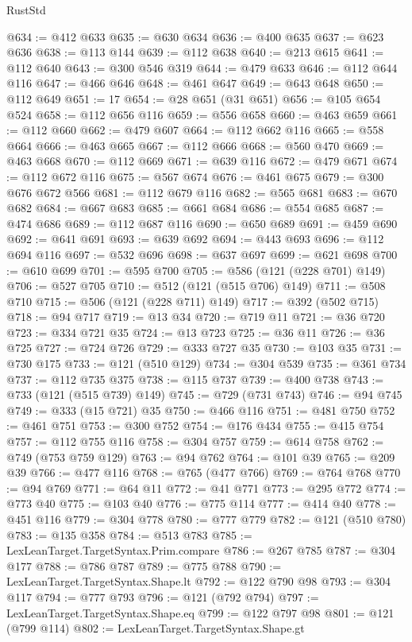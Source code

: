 \begin{lexlean}{RustStd}
\begin{coremodule}
{\begin{coremodule}
{{{{{{{{{{{{{{{{{{{{{{{{{{{{{{{{{{{{{{{{{{{{@634 := @412 @633
@635 := @630 @634
@636 := @400 @635
@637 := @623 @636
@638 := @113 @144
@639 := @112 @638
@640 := @213 @615
@641 := @112 @640
@643 := @300 @546 @319
@644 := @479 @633
@646 := @112 @644 @116
@647 := @466 @646
@648 := @461 @647
@649 := @643 @648
@650 := @112 @649
@651 := 17
@654 := @28 @651 (@31 @651)
@656 := @105 @654 @524
@658 := @112 @656 @116
@659 := @556 @658
@660 := @463 @659
@661 := @112 @660
@662 := @479 @607
@664 := @112 @662 @116
@665 := @558 @664
@666 := @463 @665
@667 := @112 @666
@668 := @560 @470
@669 := @463 @668
@670 := @112 @669
@671 := @639 @116
@672 := @479 @671
@674 := @112 @672 @116
@675 := @567 @674
@676 := @461 @675
@679 := @300 @676 @672 @566
@681 := @112 @679 @116
@682 := @565 @681
@683 := @670 @682
@684 := @667 @683
@685 := @661 @684
@686 := @554 @685
@687 := @474 @686
@689 := @112 @687 @116
@690 := @650 @689
@691 := @459 @690
@692 := @641 @691
@693 := @639 @692
@694 := @443 @693
@696 := @112 @694 @116
@697 := @532 @696
@698 := @637 @697
@699 := @621 @698
@700 := @610 @699
@701 := @595 @700
@705 := @586 (@121 (@228 @701) @149)
@706 := @527 @705
@710 := @512 (@121 (@515 @706) @149)
@711 := @508 @710
@715 := @506 (@121 (@228 @711) @149)
@717 := @392 (@502 @715)
@718 := @94 @717
@719 := @13 @34
@720 := @719 @11
@721 := @36 @720
@723 := @334 @721 @35
@724 := @13 @723
@725 := @36 @11
@726 := @36 @725
@727 := @724 @726
@729 := @333 @727 @35
@730 := @103 @35
@731 := @730 @175
@733 := @121 (@510 @129)
@734 := @304 @539
@735 := @361 @734
@737 := @112 @735 @375
@738 := @115 @737
@739 := @400 @738
@743 := @733 (@121 (@515 @739) @149)
@745 := @729 (@731 @743)
@746 := @94 @745
@749 := @333 (@15 @721) @35
@750 := @466 @116
@751 := @481 @750
@752 := @461 @751
@753 := @300 @752
@754 := @176 @434
@755 := @415 @754
@757 := @112 @755 @116
@758 := @304 @757
@759 := @614 @758
@762 := @749 (@753 @759 @129)
@763 := @94 @762
@764 := @101 @39
@765 := @209 @39
@766 := @477 @116
@768 := @765 (@477 @766)
@769 := @764 @768
@770 := @94 @769
@771 := @64 @11
@772 := @41 @771
@773 := @295 @772
@774 := @773 @40
@775 := @103 @40
@776 := @775 @114
@777 := @414 @40
@778 := @451 @116
@779 := @304 @778
@780 := @777 @779
@782 := @121 (@510 @780)
@783 := @135 @358
@784 := @513 @783
@785 := LexLeanTarget.TargetSyntax.Prim.compare
@786 := @267 @785
@787 := @304 @177
@788 := @786 @787
@789 := @775 @788
@790 := LexLeanTarget.TargetSyntax.Shape.lt
@792 := @122 @790 @98
@793 := @304 @117
@794 := @777 @793
@796 := @121 (@792 @794)
@797 := LexLeanTarget.TargetSyntax.Shape.eq
@799 := @122 @797 @98
@801 := @121 (@799 @114)
@802 := LexLeanTarget.TargetSyntax.Shape.gt
}}}}}}}}}}}}}}}}}}}}}}}}}}}}}}}}}}}}}}}}}}}}
\end{coremodule}}
\end{coremodule}
\end{lexlean}

